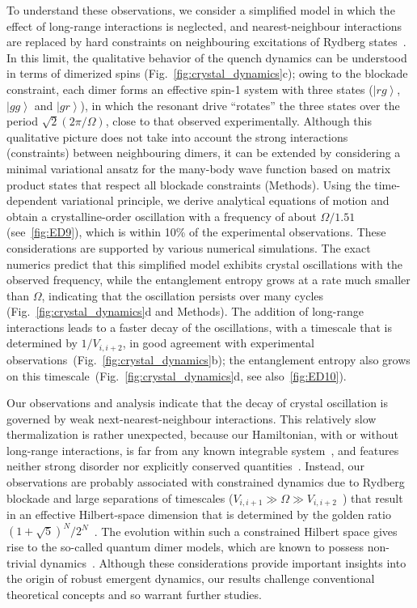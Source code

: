 \documentclass[prl,nobalancelastpage,twocolumn,superscriptaddress,nofootinbib]{revtex4}
\newcommand{\ket}[1]{\left|#1\right\rangle}
\begin{document}
To understand these observations, we consider a simplified model in which the
effect of long-range interactions is neglected, and nearest-neighbour
interactions are replaced by hard constraints on neighbouring excitations of
Rydberg states~\cite{Fendley2004}. In this limit, the qualitative behavior of
the quench dynamics can be understood in terms of dimerized spins
(Fig.~\ref{fig:crystal_dynamics}c); owing to the blockade constraint, each
dimer forms an effective spin-1 system with three states ($\ket{rg}$,
$\ket{gg}$ and $\ket{gr}$), in which the resonant drive ``rotates'' the three
states over the period $\sqrt{2} (2\pi/\Omega)$, close to that observed
experimentally. Although this qualitative picture does not take into account the
strong interactions (constraints) between neighbouring dimers, it  can be
extended by considering a minimal variational ansatz for the many-body wave
function based on matrix product states that respect all blockade constraints
(Methods). Using the time-dependent variational principle, we derive analytical
equations of motion and obtain a crystalline-order oscillation with a frequency
of about $\Omega/1.51$ (see~\ref{fig:ED9}), which is within 10\% of the
experimental observations. These considerations are  supported by various
numerical simulations. The exact numerics predict that this simplified
model exhibits crystal oscillations with the observed frequency, while the
entanglement entropy grows at a rate much smaller than $\Omega$, indicating
that the oscillation persists over many cycles
(Fig.~\ref{fig:crystal_dynamics}d and Methods). The addition of long-range
interactions leads to a faster decay of the oscillations, with a timescale that
is determined by $1/V_{i,i+2}$, in good agreement with experimental
observations~(Fig.~\ref{fig:crystal_dynamics}b); the entanglement entropy
also grows on this timescale~(Fig.~\ref{fig:crystal_dynamics}d, see
also~\ref{fig:ED10}).

Our observations and analysis indicate that the decay of crystal oscillation is
governed by weak next-nearest-neighbour interactions. This relatively slow
thermalization is rather unexpected, because our Hamiltonian, with or without
long-range interactions, is far from any known integrable
system~\cite{Fendley2004}, and features neither strong disorder nor explicitly
conserved quantities~\cite{DAlessio2016}. Instead, our observations  are
probably associated with constrained dynamics due to Rydberg blockade and large
separations of timescales ($V_{i,i+1} \gg \Omega \gg
V_{i,i+2}$~\cite{Abanin2016}) that result in an effective Hilbert-space
dimension that is determined by the golden ratio
$(1+\sqrt{5})^N/2^N$~\cite{Feiguin2007,Lesanovsky2012}. The evolution within
such a constrained Hilbert space gives rise to the so-called quantum dimer
models, which are known to possess non-trivial dynamics~\cite{Moessner2011}.
Although these considerations provide important insights into the origin of
robust emergent dynamics, our results challenge conventional theoretical
concepts and so warrant further studies. 
\end{document}
